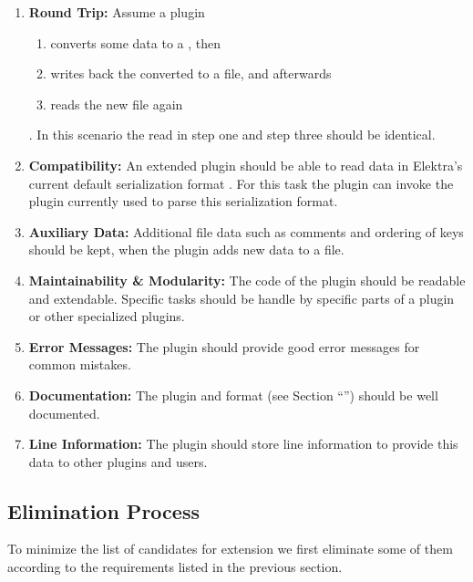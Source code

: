 \begin{enumerate}
  \item \textbf{Round Trip:}
  Assume a plugin
  \begin{enumerate}
    \item converts some  data to a , then
    \item writes back the converted  to a  file, and afterwards
    \item reads the new  file again
  \end{enumerate}
  . In this scenario the  read in step one and step three should be identical.

  \item \textbf{Compatibility:} An extended  plugin should be able to read data in Elektra’s current default serialization format . For this task the plugin can invoke the plugin currently used to parse this serialization format.

  \item \textbf{Auxiliary Data:} Additional file data such as comments and ordering of keys should be kept, when the plugin adds new data to a  file.

  \item \textbf{Maintainability \& Modularity:} The code of the plugin should be readable and extendable. Specific tasks should be handle by specific parts of a plugin or other specialized plugins.

  \item \textbf{Error Messages:} The plugin should provide good error messages for common mistakes.

  \item \textbf{Documentation:} The  plugin and format (see Section “”) should be well documented.

  \item \textbf{Line Information:} The plugin should store line information to provide this data to other plugins and users.
\end{enumerate}

\subsection{Elimination Process}

To minimize the list of candidates for extension we first eliminate some of them according to the requirements listed in the previous section.

